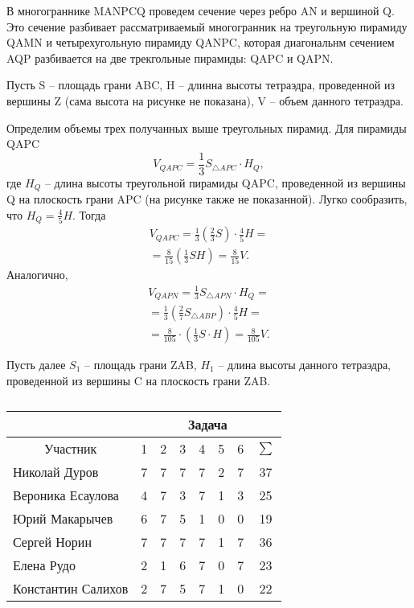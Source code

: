 \begin{multicols}{3}
	В многограннике MANPCQ проведем сечение через ребро AN и вершиной Q. Это сечение разбивает рассматриваемый многогранник на треугольную пирамиду QAMN и четырехугольную пирамиду QANPC, которая диагональнм сечением AQP разбивается на две трекгольные пирамиды: QAPC и QAPN.
		
	Пусть S -- площадь грани ABC, H -- длинна высоты тетраэдра, проведенной из вершины Z (сама высота на рисунке не показана), V -- объем данного тетраэдра.
	
	Определим объемы трех получанных выше треугольных пирамид. Для пирамиды QAPC
	\[V_{QAPC} = \frac{1}{3} S_{\bigtriangleup APC} \cdot H_Q,\]
	где $H_Q$ -- длина высоты треугольной пирамиды QAPC, проведенной из вершины Q на плоскость грани APC (на рисунке также не показанной). Лугко сообразить, что $H_Q = \frac{4}{5} H $. Тогда
	\begin{multline*}
			V_{QAPC} = \frac{1}{3} \left(\frac{2}{3} S\right) \cdot \frac{4}{5} H = \\ = \frac{8}{15} \left(\frac{1}{3} SH\right) = \frac{8}{15} V.
		\end{multline*}
	Аналогично,
	\begin{multline*}
			V_{QAPN} = \frac{1}{3} S_{\bigtriangleup APN} \cdot H_Q = \\ = \frac{1}{3} \left(\frac{2}{7} S_{\bigtriangleup ABP}\right) \cdot \frac{4}{5} H = \\ = \frac{8}{105} \cdot \left(\frac{1}{3}S\cdot H\right) = \frac{8}{105} V.
		\end{multline*}
	
	Пусть далее $S_1$ -- площадь грани ZAB, $H_1$ -- длина высоты данного тетраэдра, проведенной из вершины C на плоскость грани ZAB.
\end{multicols}

\newpage

\begin{table}
	\begin{tabular}{|l|c|c|c|c|c|c|c|}
		\hline
		& \multicolumn{7}{c|}{Задача} \\
		\hline
		\multicolumn{1}{|c|}{Участник} & 1 & 2 & 3 & 4 & 5 & 6 & $\sum$ \\
		\hline
		Николай Дуров & 7 & 7 & 7 & 7 & 2 & 7 & 37 \\
		\hline
		Вероника Есаулова & 4 & 7 & 3 & 7 & 1 & 3 & 25 \\
		\hline
		Юрий Макарычев & 6 & 7 & 5 & 1 & 0 & 0 & 19 \\
		\hline
		Сергей Норин & 7 & 7 & 7 & 7 & 1 & 7 & 36 \\
		\hline
		Елена Рудо & 2 & 1 & 6 & 7 & 0 & 7 & 23 \\
		\hline
		Константин Салихов & 2 & 7 & 5 & 7 & 1 & 0 & 22 \\
		\hline
	\end{tabular}
	\caption{}
\end{table}


